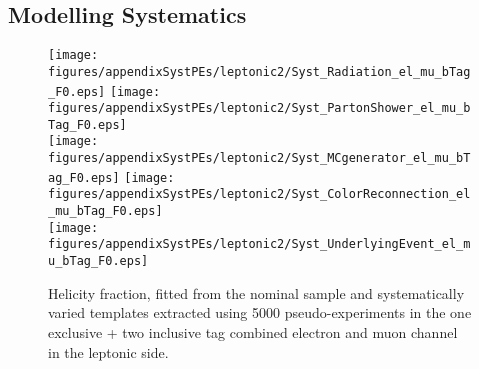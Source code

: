 \begin{comment}
\begin{figure}[!hb]
\begin{center}
 
     
	\caption{Helicity fraction, \fo fitted from the nominal \ttbar sample and systematically varied templates extracted using 5000 pseudo-experiments in the two inclusive \bt tag muon channel using the hadronic angle. }
	\label{fig:systematicVar_had_fr_mu2incl_9}
	\end{center}
	\end{figure}
\end{comment}



\clearpage
\subsection{Modelling Systematics}

\begin{figure}[!hb]
\begin{center}
        \texttt{[image: figures/appendixSystPEs/leptonic2/Syst\_Radiation\_el\_mu\_bTag\_F0.eps]}
        \texttt{[image: figures/appendixSystPEs/leptonic2/Syst\_PartonShower\_el\_mu\_bTag\_F0.eps]}\\
        \texttt{[image: figures/appendixSystPEs/leptonic2/Syst\_MCgenerator\_el\_mu\_bTag\_F0.eps]}
        \texttt{[image: figures/appendixSystPEs/leptonic2/Syst\_ColorReconnection\_el\_mu\_bTag\_F0.eps]}\\
        \texttt{[image: figures/appendixSystPEs/leptonic2/Syst\_UnderlyingEvent\_el\_mu\_bTag\_F0.eps]}
        
\caption{Helicity fraction, \fo fitted from the nominal \ttbar sample and systematically varied templates extracted using 5000 pseudo-experiments in the one exclusive + two inclusive \bt tag combined electron and muon channel in the leptonic side. }
\label{fig:systematicVar_lep_f0_elmu2incl_1}
\end{center}
\end{figure}

